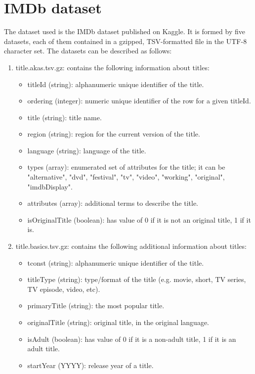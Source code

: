 \documentclass[conference,compsoc]{IEEEtran}
\theoremstyle{definition}
\begin{document}
\section{IMDb dataset} \label{sec:dataset}
The dataset used is the IMDb dataset published on Kaggle. It is formed by five datasets, each of them contained in a gzipped, TSV-formatted file in the UTF-8 character set. The datasets can be described as follows:
\begin{enumerate}
    \item title.akas.tsv.gz: contains the following information about titles:
    \begin{itemize}
        \item titleId (string): alphanumeric unique identifier of the title.
        \item ordering (integer): numeric unique identifier of the row for a given titleId.
        \item title (string): title name.
        \item region (string): region for the current version of the title.
        \item language (string): language of the title.
        \item types (array): enumerated set of attributes for the title; it can be "alternative", "dvd", "festival", "tv", "video", "working", "original", "imdbDisplay". 
        \item attributes (array): additional terms to describe the title.
        \item isOriginalTitle (boolean): has value of 0 if it is not an original title, 1 if it is.
    \end{itemize}
    \item title.basics.tsv.gz: contains the following additional information about titles:
    \begin{itemize}
        \item tconst (string): alphanumeric unique identifier of the title.
        \item titleType (string): type/format of the title (e.g. movie, short, TV series, TV episode, video, etc).
        \item primaryTitle (string): the most popular title.
        \item originalTitle (string): original title, in the original language.
        \item isAdult (boolean): has value of 0 if it is a non-adult title, 1 if it is an adult title.
        \item startYear (YYYY): release year of a title. 

\end{itemize}
\end{enumerate}
\end{document}
